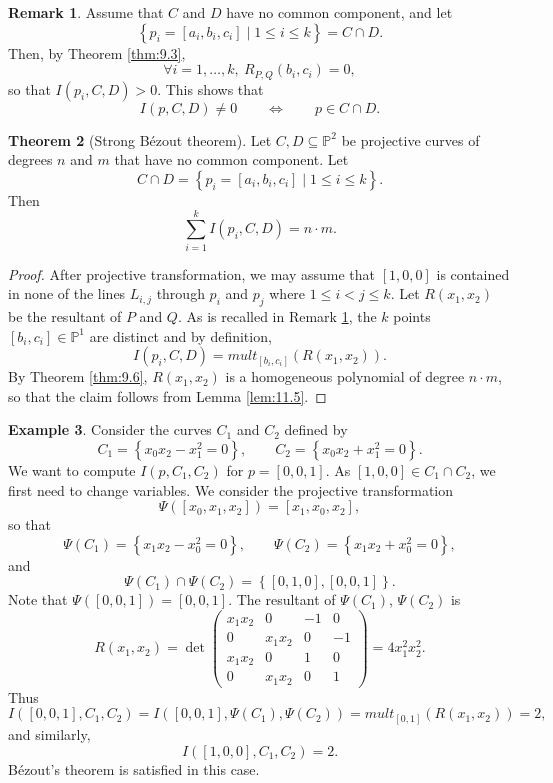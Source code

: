 \documentclass{article}
\renewcommand{\P}{\mathbb{P}}
\newcommand{\rb}[1]{\left( #1 \right)}
\renewcommand{\sb}[1]{\left[ #1 \right]}
\newcommand{\cb}[1]{\left\{ #1 \right\}}
\theoremstyle{definition}\newtheorem{definition}{Definition}[section]
\theoremstyle{definition}\newtheorem{notation}[definition]{Notation}
\theoremstyle{definition}\newtheorem{remark}[definition]{Remark}
\theoremstyle{definition}\newtheorem{example1}[definition]{Example}
\theoremstyle{definition}\newtheorem{fact}{Fact}
\theoremstyle{definition}\newtheorem{exercise}{Exercise}
\theoremstyle{definition}\newtheorem*{example2}{Example}
\newtheorem{theorem}[definition]{Theorem}
\begin{document}
\begin{remark}
\label{rem:11.10}
Assume that $ C $ and $ D $ have no common component, and let
$$ \cb{p_i = \sb{a_i, b_i, c_i} \mid 1 \le i \le k} = C \cap D. $$
Then, by Theorem \ref{thm:9.3},
$$ \forall i = 1, \dots, k, \ R_{P, Q}\rb{b_i, c_i} = 0, $$
so that $ I\rb{p_i, C, D} > 0 $. This shows that
$$ I\rb{p, C, D} \ne 0 \qquad \iff \qquad p \in C \cap D. $$
\end{remark}

\begin{theorem}[Strong B\'ezout theorem]
\label{thm:11.11}
Let $ C, D \subseteq \P^2 $ be projective curves of degrees $ n $ and $ m $ that have no common component. Let
$$ C \cap D = \cb{p_i = \sb{a_i, b_i, c_i} \mid 1 \le i \le k}. $$
Then
$$ \sum_{i = 1}^k I\rb{p_i, C, D} = n \cdot m. $$
\end{theorem}

\begin{proof}
After projective transformation, we may assume that $ \sb{1, 0, 0} $ is contained in none of the lines $ L_{i, j} $ through $ p_i $ and $ p_j $ where $ 1 \le i < j \le k $. Let $ R\rb{x_1, x_2} $ be the resultant of $ P $ and $ Q $. As is recalled in Remark \ref{rem:11.10}, the $ k $ points $ \sb{b_i, c_i} \in \P^1 $ are distinct and by definition,
$$ I\rb{p_i, C, D} = mult_{\sb{b_i, c_i}}\rb{R\rb{x_1, x_2}}. $$
By Theorem \ref{thm:9.6}, $ R\rb{x_1, x_2} $ is a homogeneous polynomial of degree $ n \cdot m $, so that the claim follows from Lemma \ref{lem:11.5}.
\end{proof}


\begin{example1}
Consider the curves $ C_1 $ and $ C_2 $ defined by
$$ C_1 = \cb{x_0x_2 - x_1^2 = 0}, \qquad C_2 = \cb{x_0x_2 + x_1^2 = 0}. $$
We want to compute $ I\rb{p, C_1, C_2} $ for $ p = \sb{0, 0, 1} $. As $ \sb{1, 0, 0} \in C_1 \cap C_2 $, we first need to change variables. We consider the projective transformation
$$ \Psi\rb{\sb{x_0, x_1, x_2}} = \sb{x_1, x_0, x_2}, $$
so that
$$ \Psi\rb{C_1} = \cb{x_1x_2 - x_0^2 = 0}, \qquad \Psi\rb{C_2} = \cb{x_1x_2 + x_0^2 = 0}, $$
and
$$ \Psi\rb{C_1} \cap \Psi\rb{C_2} = \cb{\sb{0, 1, 0}, \sb{0, 0, 1}}. $$
Note that $ \Psi\rb{\sb{0, 0, 1}} = \sb{0, 0, 1} $. The resultant of $ \Psi\rb{C_1} $, $ \Psi\rb{C_2} $ is
$$ R\rb{x_1, x_2} = \det\begin{pmatrix}
x_1x_2 & 0 & -1 & 0 \\
0 & x_1x_2 & 0 & -1 \\
x_1x_2 & 0 & 1 & 0 \\
0 & x_1x_2 & 0 & 1
\end{pmatrix} = 4x_1^2x_2^2. $$
Thus
$$ I\rb{\sb{0, 0, 1}, C_1, C_2} = I\rb{\sb{0, 0, 1}, \Psi\rb{C_1}, \Psi\rb{C_2}} = mult_{\sb{0, 1}}\rb{R\rb{x_1, x_2}} = 2, $$
and similarly,
$$ I\rb{\sb{1, 0, 0}, C_1, C_2} = 2. $$
B\'ezout's theorem is satisfied in this case.
\end{example1}
\end{document}

